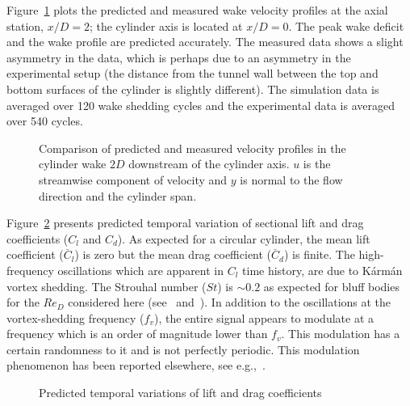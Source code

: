Figure~\ref{fig:velocity_Normal_Re20k} plots the predicted and measured wake
velocity profiles at the axial station, $x/D=2$; the cylinder axis is located
at $x/D=0$. The peak wake deficit and the wake profile are predicted
accurately. The measured data shows a slight asymmetry in the data, which is
perhaps due to an asymmetry in the experimental setup (the distance from the
tunnel wall between the top and bottom surfaces of the cylinder is slightly
different). The simulation data is averaged over 120 wake shedding cycles and
the experimental data is averaged over 540 cycles.
%
\begin{figure}[htb!]
  \caption{Comparison of predicted and measured velocity profiles in the
    cylinder wake $2D$ downstream of the cylinder axis. $u$ is the streamwise
    component of velocity and $y$ is normal to the flow direction and the cylinder
    span.}
  \label{fig:velocity_Normal_Re20k}
\end{figure}

Figure~\ref{fig:force_20k} presents predicted temporal variation of sectional
lift and drag coefficients ($C_l$ and $C_d$). As expected for a circular
cylinder, the mean lift coefficient ($\overline{C}_l$) is zero but the mean
drag coefficient ($\overline{C}_d$) is finite. The high-frequency oscillations
which are apparent in $C_l$ time history, are due to K\'arm\'an vortex
shedding. The Strouhal number ($St$) is $\sim 0.2$ as expected for bluff bodies
for the $Re_D$ considered here (see~\cite{travin2000detached}
and~\cite{norberg2013pressure}). In addition to the oscillations at the
vortex-shedding frequency ($f_v$), the entire signal appears to modulate at a
frequency which is an order of magnitude lower than $f_v$. This modulation has
a certain randomness to it and is not perfectly periodic. This modulation
phenomenon has been reported elsewhere, see e.g.,~\cite{travin2000detached}. 
%
\begin{figure}[htb!]
  \caption{Predicted temporal variations of lift and drag coefficients}
  \label{fig:force_20k}
\end{figure}


